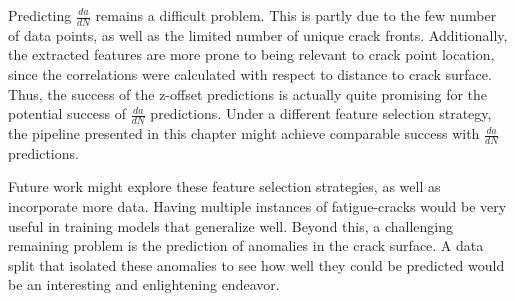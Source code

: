 Predicting $\frac{da}{dN}$ remains a difficult problem.  This is partly due to the few number of data points, as well as the limited number of unique crack fronts.  Additionally, the extracted features are more prone to being relevant to crack point location, since the correlations were calculated with respect to distance to crack surface.  Thus, the success of the z-offset predictions is actually quite promising for the potential success of $\frac{da}{dN}$ predictions.  Under a different feature selection strategy, the pipeline presented in this chapter might achieve comparable success with $\frac{da}{dN}$ predictions.

Future work might explore these feature selection strategies, as well as incorporate more data.  Having multiple instances of fatigue-cracks would be very useful in training models that generalize well.  Beyond this, a challenging remaining problem is the prediction of anomalies in the crack surface.  A data split that isolated these anomalies to see how well they could be predicted would be an interesting and enlightening endeavor.



